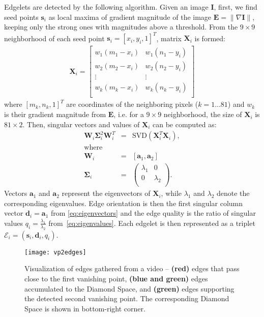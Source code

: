 \documentclass[]{elsarticle}
\begin{document}
Edgelets are detected by the following algorithm. Given an image $\mathbf{I}$, first, we find seed points $\mathbf{s}_i$ as local maxima of gradient magnitude of the image $\mathbf{E} = \|\nabla{\mathbf{I}}\|$, keeping only the strong ones with magnitudes above a threshold. From the $9\times{}9$ neighborhood of each seed point $\mathbf{s}_i = [x_i, y_i, 1]^T$, matrix $\mathbf{X}_i$ is formed:
\begin{eqnarray}
	&\mathbf{X}_i =
	\left[
	\begin{array}{cc}
		w_1 (m_1 - x_i) & w_1 (n_1 - y_i) \\
		w_2 (m_2 - x_i) & w_2 (n_2 - y_i) \\
		\vdots & \vdots \\
		w_k (m_k - x_i) & w_k (n_k - y_i) \\
	\end{array}
	\right]&
\end{eqnarray}
where $[m_k, n_k,1]^T$ are coordinates of the neighboring pixels ($k=1\dots81$) and $w_k$ is their gradient magnitude from $\mathbf{E}$, i.e. for a $9\times9$ neighborhood, the size of $\mathbf{X}_i$ is $81\times2$. Then, singular vectors and values of $\mathbf{X}_i$ can be computed as:
\begin{eqnarray}
	\label{eq:svd}
	\mathbf{W}_i \mathbf{\Sigma}_i^{2} \mathbf{W}_i^{T}  &=& \mathrm{SVD}\left(\mathbf{X}_i^{T}\mathbf{X}_i\right), \\
    \mathrm{where}&& \nonumber \\
	\label{eq:eigenvectors}
	\mathbf{W}_i &=& \left[ \mathbf{a}_1, \mathbf{a}_2 \right] \\
	\label{eq:eigenvalues}
	\mathbf{\Sigma}_i &=&
	\left(
	\begin{array}{cc}
		\lambda_1 & 0 \\
		0 & \lambda_2 \\
	\end{array}
	\right).
\end{eqnarray}
Vectors $\mathbf{a}_1$ and $\mathbf{a}_2$ represent the eigenvectors of $\mathbf{X}_i$, while $\lambda_1$ and $\lambda_2$ denote the corresponding eigenvalues. Edge orientation is then the first singular column vector $\mathbf{d}_i = \mathbf{a}_1$ from \eqref{eq:eigenvectors} and the edge quality is the ratio of singular values $q_i = \frac{\lambda_1}{\lambda_2}$ from~\eqref{eq:eigenvalues}. Each edgelet is then represented as a triplet $\mathcal{E}_i = \left( \mathbf{s}_i, \mathbf{d}_i, q_i \right)$.

\begin{figure*}[t]
	\centering
	\texttt{[image: vp2edges]}
	\caption{Visualization of edges gathered from a video -- \textbf{(red)} edges that pass close to the first vanishing point, \textbf{(blue and green)} edges accumulated to the Diamond Space, and \textbf{(green)} edges supporting the detected second vanishing point. The corresponding Diamond Space is shown in bottom-right corner.
	} \label{fig:edgeletsvideo}
\end{figure*}
\end{document}
